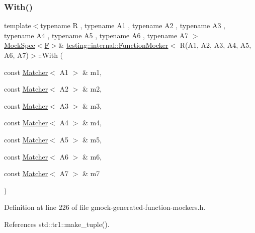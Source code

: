 \subsubsection{\texorpdfstring{With()}{With()}}
{\footnotesize\ttfamily template$<$typename R , typename A1 , typename A2 , typename A3 , typename A4 , typename A5 , typename A6 , typename A7 $>$ \\
\hyperlink{classtesting_1_1internal_1_1MockSpec}{Mock\+Spec}$<$\hyperlink{classtesting_1_1internal_1_1FunctionMocker_3_01R_07A1_00_01A2_00_01A3_00_01A4_00_01A5_00_01A6_00_01A7_08_4_a2ea0e33d9cc0d1f57d58b4aee98c117c}{F}$>$\& \hyperlink{classtesting_1_1internal_1_1FunctionMocker}{testing\+::internal\+::\+Function\+Mocker}$<$ R(A1, A2, A3, A4, A5, A6, A7)$>$\+::With (\begin{DoxyParamCaption}\item[{const \hyperlink{classtesting_1_1Matcher}{Matcher}$<$ A1 $>$ \&}]{m1,  }\item[{const \hyperlink{classtesting_1_1Matcher}{Matcher}$<$ A2 $>$ \&}]{m2,  }\item[{const \hyperlink{classtesting_1_1Matcher}{Matcher}$<$ A3 $>$ \&}]{m3,  }\item[{const \hyperlink{classtesting_1_1Matcher}{Matcher}$<$ A4 $>$ \&}]{m4,  }\item[{const \hyperlink{classtesting_1_1Matcher}{Matcher}$<$ A5 $>$ \&}]{m5,  }\item[{const \hyperlink{classtesting_1_1Matcher}{Matcher}$<$ A6 $>$ \&}]{m6,  }\item[{const \hyperlink{classtesting_1_1Matcher}{Matcher}$<$ A7 $>$ \&}]{m7 }\end{DoxyParamCaption})\hspace{0.3cm}{\ttfamily [inline]}}



Definition at line 226 of file gmock-\/generated-\/function-\/mockers.\+h.



References std\+::tr1\+::make\+\_\+tuple().


